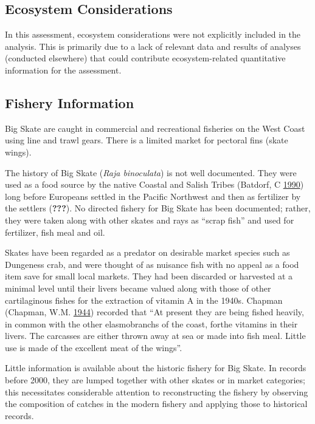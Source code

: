 \documentclass[12pt,]{article}
\begin{document}
\hypertarget{ecosystem-considerations-1}{%
\subsection{Ecosystem Considerations}\label{ecosystem-considerations-1}}

In this assessment, ecosystem considerations were not explicitly
included in the analysis. This is primarily due to a lack of relevant
data and results of analyses (conducted elsewhere) that could contribute
ecosystem-related quantitative information for the assessment.

\hypertarget{fishery-information}{%
\subsection{Fishery Information}\label{fishery-information}}

Big Skate are caught in commercial and recreational fisheries on the
West Coast using line and trawl gears. There is a limited market for
pectoral fins (skate wings).

The history of Big Skate (\emph{Raja binoculata}) is not well
documented. They were used as a food source by the native Coastal and
Salish Tribes (Batdorf, C \protect\hyperlink{ref-Batdorf1990}{1990})
long before Europeans settled in the Pacific Northwest and then as
fertilizer by the settlers ({\textbf{???}}). No directed fishery for Big
Skate has been documented; rather, they were taken along with other
skates and rays as ``scrap fish'' and used for fertilizer, fish meal and
oil.

Skates have been regarded as a predator on desirable market species such
as Dungeness crab, and were thought of as nuisance fish with no appeal
as a food item save for small local markets. They had been discarded or
harvested at a minimal level until their livers became valued along with
those of other cartilaginous fishes for the extraction of vitamin A in
the 1940s. Chapman (Chapman, W.M.
\protect\hyperlink{ref-Chapman1944}{1944}) recorded that ``At present
they are being fished heavily, in common with the other elasmobranchs of
the coast, forthe vitamins in their livers. The carcasses are either
thrown away at sea or made into fish meal. Little use is made of the
excellent meat of the wings''.

Little information is available about the historic fishery for Big
Skate. In records before 2000, they are lumped together with other
skates or in market categories; this necessitates considerable attention
to reconstructing the fishery by observing the composition of catches in
the modern fishery and applying those to historical records.
\end{document}
